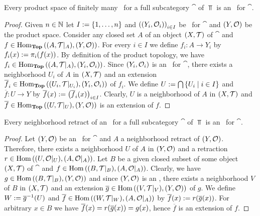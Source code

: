 \begin{proposition}
	Every product space of finitely many \anes\ for a full subcategory $\cat$ of $\Top$ is an \ane\ for $\cat$. 
\end{proposition}
\begin{proof}
	Given $n \in \mathbb N$ let $I := {\left \{ 1, \dots, n \right \}}$ and $\pbraces{\indtspace[Y][O]}_{i \in I}$ be \anes\ for $\cat$ and $\tspace[Y][O]$ be the product space. Consider any closed set $A$ of an object $\tspace$ of $\cat$ and $f \in \Hom_\Top\pbraces{\reltspace, \tspace[Y][O]}$. For every $i \in I$ we define $f_i: A \to Y_i$ by $f_i(x) := \pi_i{\left ( f(x) \right )}$. By definition of the product topology, we have $f_i \in \Hom_\Top\pbraces{\reltspace, \indtspace[Y][O]}$. Since $\indtspace[Y][O]$ is an \ane\ for $\cat$, there exists a neighborhood $U_i$ of $A$ in $\tspace$ and an extension $\overline{f}_i \in \Hom_\Top\pbraces{\reltspace[U_i], \indtspace[Y][O]}$ of $f_i$. We define $U := \bigcap {\left \{ U_i \mid i \in I \right \}}$ and $\overline{f}: U \to Y$ by $\overline{f}(x) := {\left ( \overline{f}_i(x) \right )}_{i \in I}$. Clearly, $U$ is a neighborhood of $A$ in $\tspace$ and $\overline{f} \in \Hom_\Top\pbraces{\reltspace[U], \tspace[Y][O]}$ is an extension of $f$. 
\end{proof}

\begin{proposition}
	Every neighborhood retract of an \ane\ for a full subcategory $\cat$ of $\Top$ is an \ane\ for $\cat$. 
\end{proposition}
\begin{proof}
	Let $\tspace[Y][O]$ be an \ane\ for $\cat$ and $A$ a neighborhood retract of $\tspace[Y][O]$. Therefore, there exists a neighborhood $U$ of $A$ in $\tspace[Y][O]$ and a retraction $r \in \Hom\pbraces{\reltspace[U][O], \reltspace[A][O]}$. Let $B$ be a given closed subset of some object $\tspace$ of $\cat$ and $f \in \Hom\pbraces{\reltspace[B], \reltspace[A][O]}$. Clearly, we have $g \in  \Hom\pbraces{\reltspace[B], \tspace[Y][O]}$ and since $\tspace[Y][O]$ is an \ane, there exists a neighborhood $V$ of $B$ in $\tspace$ and an extension $\overline{g} \in \Hom\pbraces{\reltspace[V], \tspace[Y][O]}$ of $g$. We define $W := \overline{g}^{-1}{\left ( U \right )}$ and $\overline{f} \in  \Hom\pbraces{\reltspace[W], \reltspace[A][O]}$ by $\overline{f}(x) := r{\left ( \overline{g}(x) \right )}$. For arbitrary $x \in B$ we have $\overline{f}(x) = r{\left ( \overline{g}(x) \right )} = g(x)$, hence $\overline{f}$ is an extension of $f$.  
\end{proof}

